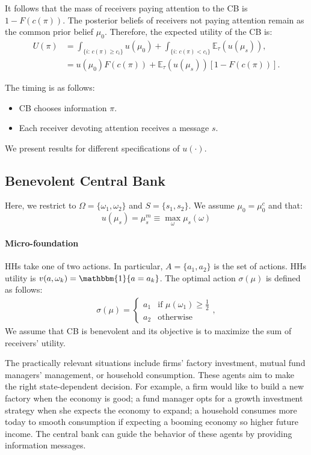 \documentclass[12pt,a4paper]{article}
\begin{document}
It follows that the mass of receivers paying attention to the CB is $1-F(c(\pi))$. The posterior beliefs of receivers not paying attention remain as the common prior belief $\mu_0$. Therefore, the expected utility of the CB is:
\begin{align}
   U(\pi) & = \int_{\{i:\, c(\pi) \geq c_i\}} u(\mu_0) + \int_{\{i:\, c(\pi) < c_i\}} \mathbb{E}_\tau(u(\mu_s)), \\
   & = u(\mu_0)F(c(\pi)) + \mathbb{E}_\tau(u(\mu_s))[1-F(c(\pi))].
\end{align}

The timing is as follows:
\begin{itemize}
    \item CB chooses information $\pi$.
    \item Each receiver devoting attention receives a message $s$.
\end{itemize}

We present results for different specifications of $u(\cdot)$.

\subsection{Benevolent Central Bank}

Here, we restrict to $\Omega=\{\omega_1,\omega_2\}$ and $S=\{s_1,s_2\}$. We assume $\mu_0=\mu_0^c$ and that:
\begin{equation}
    u(\mu_s)=\mu_s^m\equiv\max_{\omega}\mu_s(\omega)
\end{equation}

\paragraph{Micro-foundation}
HHs take one of two actions. In particular, $A=\{a_1,a_2\}$ is the set of actions. HHs utility is $v(a,\omega_k)=\mathbbm{1}\{a=a_{k}\}$. The optimal action $\sigma(\mu)$ is defined as follows: 
\begin{align}
\sigma(\mu)=\left\{\begin{array}{ll}
a_1   &  \mbox{if } \mu(\omega_1)\geq \frac{1}{2}\\
a_2   &  \mbox{otherwise}
\end{array}\right.,
\end{align}
We assume that CB is benevolent and its objective is to maximize the sum of receivers' utility.


The practically relevant situations include firms' factory investment, mutual fund managers' management, or household consumption. These agents aim to make the right state-dependent decision. For example, a firm would like to build a new factory when the economy is good; a fund manager opts for a growth investment strategy when she expects the economy to expand; a household consumes more today to smooth consumption if expecting a booming economy so higher future income. The central bank can guide the behavior of these agents by providing information messages.
\end{document}
